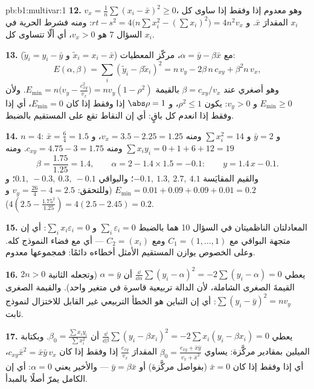 \begin{solution}{pb:b1:multivar:1}
\textbf{12.} $v_x = \frac1n\sum(x_i - \bar x)^2 \geq 0$، وهو معدوم
إذا وفقط إذا ساوى كل $x_i$ المقدارَ $\bar x$. و $rt - s^2 = 4\bigl(n\sum
x_i^2 - (\sum x_i)^2\bigr) = 4n^2 v_x$: ومنه فشرط الحرية في السؤال 7
هو $v_x > 0$، أي ألّا تتساوى كل $x_i$.

\textbf{13.} مع $\alpha = \bar y - \beta\bar x$، مركّز
المعطيات ($\tilde x_i = x_i - \bar x$ و $\tilde y_i = y_i - \bar y$):
\[
E(\alpha, \beta) = \sum_i(\tilde y_i - \beta\tilde x_i)^2
= n\,v_y - 2\beta\,n\,c_{xy} + \beta^2 n\,v_x ,
\]
وهو أصغري عند $\beta = c_{xy}/v_x$ بالقيمة $E_{\min} =
n\bigl(v_y - \frac{c_{xy}^2}{v_x}\bigr) = n v_y(1 - \rho^2)$.
ولأن $E_{\min} \geq 0$ و $v_y > 0$: يكون $\rho^2 \leq 1$، و
$\abs\rho = 1$ إذا وفقط إذا كان $E_{\min} = 0$، أي إذا وفقط إذا انعدم كل
باقٍ: أي إن النقاط تقع على المستقيم بالضبط.

\textbf{14.} $n = 4$: $\bar x = \frac64 = 1.5$ و $\bar y = 2$ و
$\sum x_i^2 = 14$ ومنه $v_x = 3.5 - 2.25 = 1.25$، و $\sum x_iy_i =
0 + 1 + 6 + 12 = 19$ ومنه $c_{xy} = 4.75 - 3 = 1.75$. ومنه
\[
\beta = \frac{1.75}{1.25} = 1.4,
\qquad
\alpha = 2 - 1.4\times1.5 = -0.1 :
\qquad y = 1.4\,x - 0.1 .
\]
والقيم المقايَسة $-0.1,\ 1.3,\ 2.7,\ 4.1$؛ والبواقي $0.1,\ -0.3,\
0.3,\ -0.1$؛ و $E_{\min} = 0.01 + 0.09 + 0.09 + 0.01 = 0.2$
(وللتحقق: $v_y = \frac{26}4 - 4 = 2.5$ و $4(2.5 -
\frac{1.75^2}{1.25}) = 4(2.5 - 2.45) = 0.2$).

\textbf{15.} المعادلتان الناظميتان في السؤال 10 هما
بالضبط $\sum_i\varepsilon_i = 0$ و $\sum_i x_i\varepsilon_i =
0$: أي إن متجهة البواقي  مع $C_1 = (1, \dots, 1)$
ومع $C_2 = (x_i)$ --- أي مع فضاء النموذج كله. وعلى
الخصوص يوازن المستقيم الأمثل أخطاءه دائمًا: فمجموعها
معدوم.

\textbf{16.} يعطي $\frac{\dd}{\dd\alpha}\sum(y_i - \alpha)^2 =
-2\sum(y_i - \alpha) = 0$ أن $\alpha = \bar y$ (وتجعله
 الثانية $2n > 0$ القيمةَ الصغرى الشاملة، لأن
الدالة تربيعية قاسرة في متغير واحد). والقيمة
الصغرى $\sum(y_i - \bar y)^2 = n v_y$: أي إن التباين هو
الخطأ التربيعي غير القابل للاختزال لنموذج ثابت.

\textbf{17.} يعطي $\frac{\dd}{\dd\beta}\sum(y_i - \beta x_i)^2 =
-2\sum x_i(y_i - \beta x_i) = 0$ أن $\beta_0 = \frac{\sum
x_iy_i}{\sum x_i^2}$. وبكتابة الميلين بمقادير
مركَّزة: يساوي $\beta_0 = \frac{c_{xy} + \bar x\bar y}{v_x + \bar
x^2}$ المقدارَ $\frac{c_{xy}}{v_x}$ إذا وفقط إذا كان $c_{xy}\bar x^2 = \bar
x\bar y\,v_x$، أي إذا وفقط إذا كان $\bar x = 0$ (بفواصل مركَّزة) أو
$\bar y = \beta\bar x$ --- والأخير يعني $\alpha = 0$: أي إن
 الكامل يمرّ أصلًا بالمبدأ.


\end{solution}
